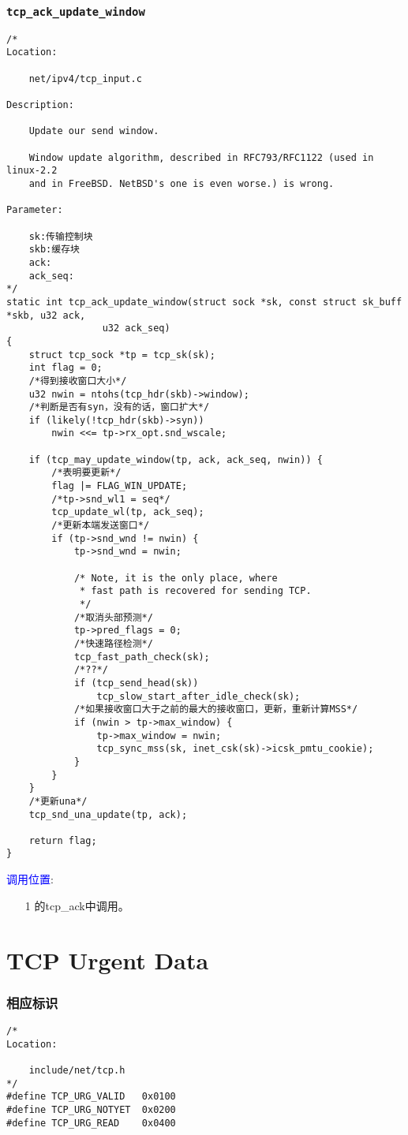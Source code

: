 		\subsubsection{\texttt{tcp_ack_update_window}}
			\label{WindowUpdate:tcp_ack_update_window}
\begin{verbatim}
/* 
Location:

	net/ipv4/tcp_input.c

Description:

	Update our send window.

	Window update algorithm, described in RFC793/RFC1122 (used in linux-2.2
	and in FreeBSD. NetBSD's one is even worse.) is wrong.

Parameter:

	sk:传输控制块
	skb:缓存块
	ack:	
	ack_seq:
*/
static int tcp_ack_update_window(struct sock *sk, const struct sk_buff *skb, u32 ack,
				 u32 ack_seq)
{
	struct tcp_sock *tp = tcp_sk(sk);
	int flag = 0;
	/*得到接收窗口大小*/
	u32 nwin = ntohs(tcp_hdr(skb)->window);
	/*判断是否有syn，没有的话，窗口扩大*/
	if (likely(!tcp_hdr(skb)->syn))
		nwin <<= tp->rx_opt.snd_wscale;

	if (tcp_may_update_window(tp, ack, ack_seq, nwin)) {
		/*表明要更新*/
		flag |= FLAG_WIN_UPDATE;
		/*tp->snd_wl1 = seq*/
		tcp_update_wl(tp, ack_seq);
		/*更新本端发送窗口*/
		if (tp->snd_wnd != nwin) {
			tp->snd_wnd = nwin;

			/* Note, it is the only place, where
			 * fast path is recovered for sending TCP.
			 */
			/*取消头部预测*/
			tp->pred_flags = 0;
			/*快速路径检测*/
			tcp_fast_path_check(sk);
			/*??*/
			if (tcp_send_head(sk))
				tcp_slow_start_after_idle_check(sk);
			/*如果接收窗口大于之前的最大的接收窗口，更新，重新计算MSS*/
			if (nwin > tp->max_window) {
				tp->max_window = nwin;
				tcp_sync_mss(sk, inet_csk(sk)->icsk_pmtu_cookie);
			}
		}
	}
	/*更新una*/
	tcp_snd_una_update(tp, ack);

	return flag;
}
\end{verbatim}

		\textcolor{blue}{调用位置}:
			\begin{enumerate}
				\item[1]		\label{ClientReceiveSYN+ACK:tcp_ack}的tcp\_ack中调用。
			\end{enumerate}

\section{TCP Urgent Data}
		\subsubsection{相应标识}
\begin{verbatim}
/*
Location:

	include/net/tcp.h
*/
#define TCP_URG_VALID	0x0100
#define TCP_URG_NOTYET	0x0200
#define TCP_URG_READ	0x0400
\end{verbatim}
